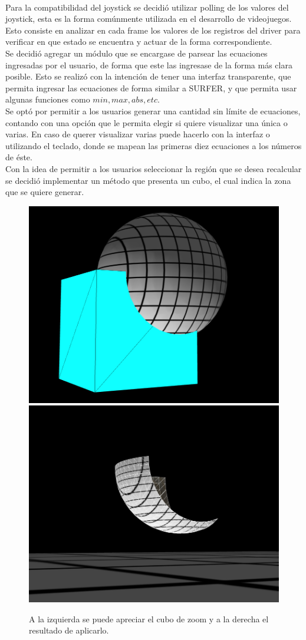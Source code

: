 \documentclass[12pt]{article}
\begin{document}
\\Para la compatibilidad del joystick se decidió utilizar polling de los valores del joystick, esta es la forma comúnmente utilizada en el desarrollo de videojuegos\cite{engine}. Esto consiste en analizar en cada frame los valores de los registros del driver para verificar en que estado se encuentra y actuar de la forma correspondiente.
\\Se decidió agregar un módulo que se encargase de parsear las ecuaciones ingresadas por el usuario, de forma que este las ingresase de la forma más clara posible. Esto se realizó con la intención de tener una interfaz transparente, que permita ingresar las ecuaciones de forma similar a SURFER, y que permita usar algunas funciones como $min, max, abs, etc$.
\\Se optó por permitir a los usuarios generar una cantidad sin límite de ecuaciones, contando con una opción que le permita elegir si quiere visualizar una única o varias. En caso de querer visualizar varias puede hacerlo con la interfaz o utilizando el teclado, donde se mapean las primeras diez ecuaciones a los números de éste. 
\\Con la idea de permitir a los usuarios seleccionar la región que se desea recalcular se decidió implementar un método que presenta un cubo, el cual indica la zona que se quiere generar.
\begin{figure}[h!]
\includegraphics[width =0.45\linewidth]{cubo1.png}
\hfill
\includegraphics[width =0.45\linewidth]{cubo2.png}
\caption{ A la izquierda se puede apreciar el cubo de zoom y a la derecha el resultado de aplicarlo.}
\label{ fig : surface }
\end{figure}
\clearpage
\end{document}

